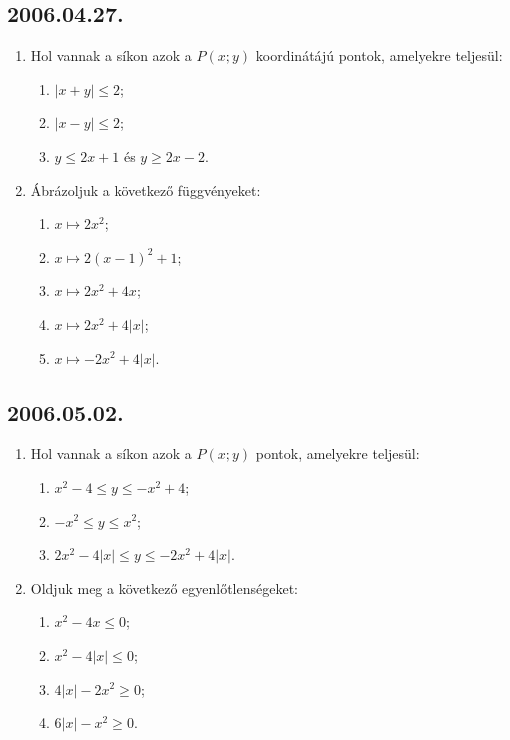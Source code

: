\documentclass{article}
\newenvironment{abc}{\begin{enumerate}[label=\textit{\alph*})]}{\end{enumerate}}
\begin{document}
\subsection*{2006.04.27.}
\begin{enumerate}
\item Hol vannak a síkon azok a $P(x;y)$ koordinátájú pontok, amelyekre teljesül:
\begin{abc}
\item $|x+y|\le2$;
\item $|x-y|\le2$;
\item $y\le2x+1$ és $y\ge2x-2$.
\end{abc}
\item Ábrázoljuk a következő függvényeket:
\begin{abc}
\item $x \mapsto 2x^2$;
\item $x \mapsto 2(x-1)^2+1$;
\item $x \mapsto 2x^2+4x$;
\item $x \mapsto 2x^2+4|x|$;
\item $x \mapsto -2x^2+4|x|$.
\end{abc}
\end{enumerate}

\subsection*{2006.05.02.}
\begin{enumerate}
\item Hol vannak a síkon azok a $P(x;y)$ pontok, amelyekre teljesül:
\begin{abc}
\item $x^2-4\le y \le-x^2+4$;
\item $-x^2\le y \le x^2$;
\item $2x^2-4|x|\le y \le -2x^2+4|x|$.
\end{abc}
\item Oldjuk meg a következő egyenlőtlenségeket:
\begin{abc}
\item $x^2-4x \le 0$;
\item $x^2-4|x| \le 0$;
\item $4|x|-2x^2 \ge 0$;
\item $6|x|-x^2 \ge 0$.
\end{abc}
\end{enumerate}
\end{document}
